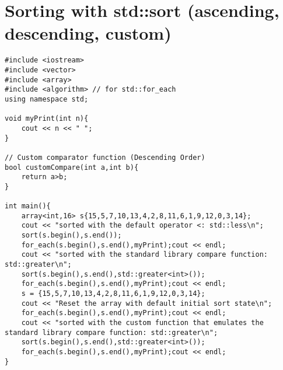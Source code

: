 \documentclass[12pt]{article}
\begin{document}
\section*{Sorting with std::sort (ascending, descending, custom)}
\begin{verbatim}
#include <iostream>
#include <vector>
#include <array>
#include <algorithm> // for std::for_each
using namespace std;

void myPrint(int n){
    cout << n << " ";
}

// Custom comparator function (Descending Order)
bool customCompare(int a,int b){
    return a>b;
}

int main(){
    array<int,16> s{15,5,7,10,13,4,2,8,11,6,1,9,12,0,3,14};
    cout << "sorted with the default operator <: std::less\n";
    sort(s.begin(),s.end());
    for_each(s.begin(),s.end(),myPrint);cout << endl;
    cout << "sorted with the standard library compare function: std::greater\n";
    sort(s.begin(),s.end(),std::greater<int>());
    for_each(s.begin(),s.end(),myPrint);cout << endl;
    s = {15,5,7,10,13,4,2,8,11,6,1,9,12,0,3,14};
    cout << "Reset the array with default initial sort state\n";
    for_each(s.begin(),s.end(),myPrint);cout << endl;
    cout << "sorted with the custom function that emulates the standard library compare function: std::greater\n";
    sort(s.begin(),s.end(),std::greater<int>());
    for_each(s.begin(),s.end(),myPrint);cout << endl;
}
\end{verbatim}
\end{document}
